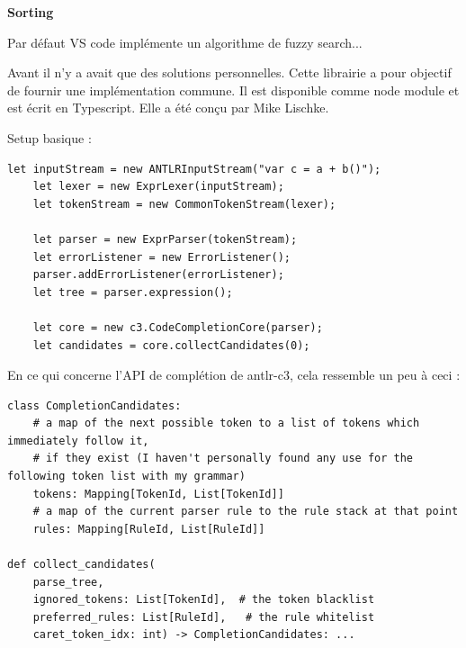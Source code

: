 \documentclass[
    iict, %
    il, %
]{heig-tb}
\begin{document}
\textbf{Sorting}

Par défaut VS code implémente un algorithme de fuzzy search...









Avant il n'y a avait que des solutions personnelles. Cette librairie a pour objectif de fournir une implémentation commune. Il est disponible comme node module et est écrit en Typescript.
Elle a été conçu par Mike Lischke.

Setup basique :

\begin{lstlisting}[frame=single,caption={antlr-setup},label={antlr-setup}]
    let inputStream = new ANTLRInputStream("var c = a + b()");
    let lexer = new ExprLexer(inputStream);
    let tokenStream = new CommonTokenStream(lexer);

    let parser = new ExprParser(tokenStream);
    let errorListener = new ErrorListener();
    parser.addErrorListener(errorListener);
    let tree = parser.expression();

    let core = new c3.CodeCompletionCore(parser);
    let candidates = core.collectCandidates(0);
\end{lstlisting}

En ce qui concerne l'API de complétion de antlr-c3, cela ressemble un peu à ceci :

\begin{lstlisting}[frame=single]
class CompletionCandidates:
    # a map of the next possible token to a list of tokens which immediately follow it,
    # if they exist (I haven't personally found any use for the following token list with my grammar)
    tokens: Mapping[TokenId, List[TokenId]]
    # a map of the current parser rule to the rule stack at that point
    rules: Mapping[RuleId, List[RuleId]]

def collect_candidates(
    parse_tree,
    ignored_tokens: List[TokenId],  # the token blacklist
    preferred_rules: List[RuleId],   # the rule whitelist
    caret_token_idx: int) -> CompletionCandidates: ...
\end{lstlisting}
\end{document}
